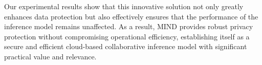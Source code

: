 \documentclass[conference]{IEEEtran}
\begin{document}
Our experimental results show that this innovative solution not only greatly enhances data protection but also effectively ensures that the performance of the inference model remains unaffected. As a result, MIND provides robust privacy protection without compromising operational efficiency, establishing itself as a secure and efficient cloud-based collaborative inference model with significant practical value and relevance.







\end{document}
